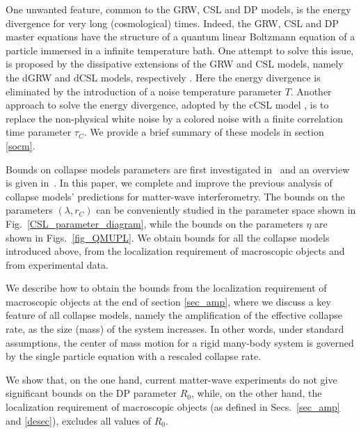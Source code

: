 \documentclass[12pt,groupedaddress,pra,aps]{revtex4-1}
\begin{document}
One unwanted feature, common to the GRW, CSL and DP  models, is the energy divergence for very long (cosmological) times. Indeed, the GRW, CSL and DP master equations have the structure of a  quantum linear Boltzmann equation \cite{Vacchini200971} of a particle immersed in a infinite temperature bath. One attempt to solve this issue, is proposed by the dissipative extensions of the GRW and CSL models, namely the dGRW and dCSL models, respectively \cite{PhysRevA.90.062135,Smirne:2014paa}. Here the energy divergence is eliminated by the introduction of a noise temperature parameter $T$. Another approach to solve the energy divergence, adopted by the cCSL model \cite{1751-8121-40-50-012,1751-8121-41-39-395308}, is to replace the non-physical white noise by a colored noise with a finite correlation time parameter $\tau_C$. We provide a brief summary of these models in section \ref{socm}. 

Bounds on collapse models parameters are first investigated in~\cite{1751-8121-40-12-S03} and an overview is given
in~\cite{adler2009quantum, 1751-8121-45-6-065304}. In this paper, we complete and improve the previous analysis of collapse models' predictions for matter-wave interferometry. The bounds on the parameters $(\lambda,r_C)$ can be conveniently studied in the parameter space \cite{collett1, collett2} shown in Fig.~\ref{CSL_parameter_diagram}, while the bounds on the parameters $\eta$ are shown in Figs.~\ref{fig_QMUPL}. We obtain bounds for all the collapse models introduced above, from the localization requirement of macroscopic objects and from experimental data.

We describe how to obtain the bounds from the localization requirement of macroscopic objects at the end of section \ref{sec_amp}, where we discuss a key feature of all collapse models, namely  the amplification of the effective collapse rate, as the size (mass) of the system increases. In other words, under standard assumptions, the center of mass motion for a rigid many-body system is governed by the single particle equation with a rescaled collapse rate. 

We show that, on the one hand, current matter-wave experiments do not give significant bounds on the DP parameter $R_0$, while, on the other hand, the localization requirement of macroscopic objects (as defined in Secs.~\ref{sec_amp} and \ref{desec}), excludes all values of $R_0$.
\end{document}
